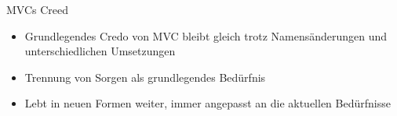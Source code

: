 \begin{frame}{MVCs Creed}
	\begin{itemize}
 		\item Grundlegendes Credo von MVC bleibt gleich trotz Namensänderungen und unterschiedlichen Umsetzungen 
 		\item Trennung von Sorgen als grundlegendes Bedürfnis
 		\item Lebt in neuen Formen weiter, immer angepasst an die aktuellen Bedürfnisse
 	\end{itemize}
\end{frame}


